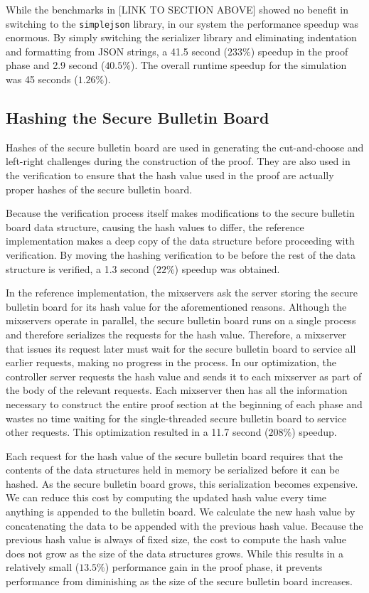 While the benchmarks in [LINK TO SECTION ABOVE] showed no benefit in switching to the \texttt{simplejson} library, in our system the performance speedup was enormous. By simply switching the serializer library and eliminating indentation and formatting from JSON strings, a 41.5 second ($233\%$) speedup in the proof phase and 2.9 second ($40.5\%$). The overall runtime speedup for the simulation was 45 seconds ($1.26\%$).

\subsection{Hashing the Secure Bulletin Board}

Hashes of the secure bulletin board are used in generating the cut-and-choose and left-right challenges during the construction of the proof. They are also used in the verification to ensure that the hash value used in the proof are actually proper hashes of the secure bulletin board.

Because the verification process itself makes modifications to the secure bulletin board data structure, causing the hash values to differ, the reference implementation makes a deep copy of the data structure before proceeding with verification. By moving the hashing verification to be before the rest of the data structure is verified, a 1.3 second ($22\%$) speedup was obtained.

In the reference implementation, the mixservers ask the server storing the secure bulletin board for its hash value for the aforementioned reasons. Although the mixservers operate in parallel, the secure bulletin board runs on a single process and therefore serializes the requests for the hash value. Therefore, a mixserver that issues its request later must wait for the secure bulletin board to service all earlier requests, making no progress in the process. In our optimization, the controller server requests the hash value and sends it to each mixserver as part of the body of the relevant requests. Each mixserver then has all the information necessary to construct the entire proof section at the beginning of each phase and wastes no time waiting for the single-threaded secure bulletin board to service other requests. This optimization resulted in a 11.7 second ($208\%$) speedup.

Each request for the hash value of the secure bulletin board requires that the contents of the data structures held in memory be serialized before it can be hashed. As the secure bulletin board grows, this serialization becomes expensive. We can reduce this cost by computing the updated hash value every time anything is appended to the bulletin board. We calculate the new hash value by concatenating the data to be appended with the previous hash value. Because the previous hash value is always of fixed size, the cost to compute the hash value does not grow as the size of the data structures grows. While this results in a relatively small ($13.5\%$) performance gain in the proof phase, it prevents performance from diminishing as the size of the secure bulletin board increases.

